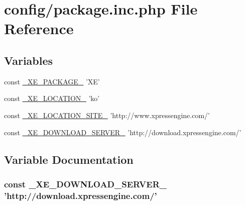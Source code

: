 \hypertarget{package_8inc_8php}{\section{config/package.inc.\-php File Reference}
\label{package_8inc_8php}
}
\subsection*{Variables}
\begin{DoxyCompactItemize}
\item 
const \hyperlink{package_8inc_8php_ac4384cdc784342cd44d75952334decb4}{\-\_\-\-X\-E\-\_\-\-P\-A\-C\-K\-A\-G\-E\-\_\-} 'X\-E'
\item 
const \hyperlink{package_8inc_8php_a7330debbfb3a027cdd5f3d3dd1dfbdd0}{\-\_\-\-X\-E\-\_\-\-L\-O\-C\-A\-T\-I\-O\-N\-\_\-} 'ko'
\item 
const \hyperlink{package_8inc_8php_a063bfd2eb9f811b1676d0dbc0cad2648}{\-\_\-\-X\-E\-\_\-\-L\-O\-C\-A\-T\-I\-O\-N\-\_\-\-S\-I\-T\-E\-\_\-} 'http\-://www.\-xpressengine.\-com/'
\item 
const \hyperlink{package_8inc_8php_a22df32d3e0eae0d60d6cddb9ec99d5ec}{\-\_\-\-X\-E\-\_\-\-D\-O\-W\-N\-L\-O\-A\-D\-\_\-\-S\-E\-R\-V\-E\-R\-\_\-} 'http\-://download.\-xpressengine.\-com/'
\end{DoxyCompactItemize}


\subsection{Variable Documentation}
\hypertarget{package_8inc_8php_a22df32d3e0eae0d60d6cddb9ec99d5ec}{
\subsubsection[{\-\_\-\-X\-E\-\_\-\-D\-O\-W\-N\-L\-O\-A\-D\-\_\-\-S\-E\-R\-V\-E\-R\-\_\-}]{\setlength{\rightskip}{0pt plus 5cm}const \-\_\-\-X\-E\-\_\-\-D\-O\-W\-N\-L\-O\-A\-D\-\_\-\-S\-E\-R\-V\-E\-R\-\_\- 'http\-://download.\-xpressengine.\-com/'}}\label{package_8inc_8php_a22df32d3e0eae0d60d6cddb9ec99d5ec}


